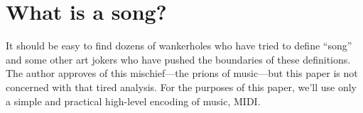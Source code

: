 \documentclass[twocolumn]{article}
\begin{document}



\section{What is a song?}

It should be easy to find dozens of wankerholes who have tried to
define ``song'' and some other art jokers who have pushed the
boundaries of these definitions. The author approves of this
mischief---the prions of music---but this paper is not concerned with
that tired analysis. For the purposes of this paper, we'll use only a
simple and practical high-level encoding of music, MIDI.
\end{document}
